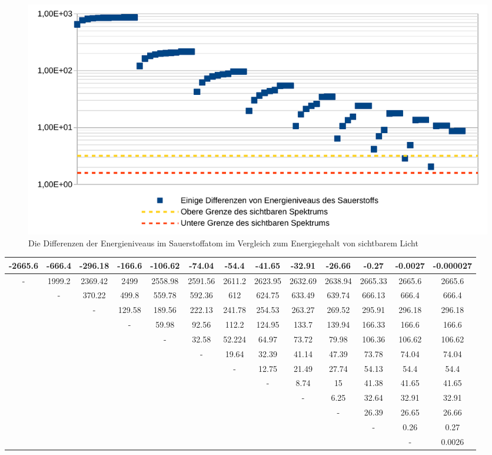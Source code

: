 \documentclass[11pt,a4paper,oneside]{report}
\begin{document}
\begin{figure}[ht]
\centering
\includegraphics[scale=0.7]{SauerstoffENiveaus.pdf}
\caption{Die Differenzen der Energieniveaus im Sauerstoffatom im Vergleich zum Energiegehalt von sichtbarem Licht}
\label{fig:ENO}
\end{figure}

\iffalse

\begin{table}[ht]
\centering
\begin{tabular}{|c|c|c|c|c|c|c|c|c|c|c|c|c|}
-2665.6&-666.4&-296.18&-166.6&-106.62&-74.04&-54.4&-41.65&-32.91&-26.66&-0.27&-0.0027&-0.000027 \\ \hline \hline
-&1999.2&2369.42&2499&2558.98&2591.56&2611.2&2623.95&2632.69&2638.94&2665.33&2665.6&2665.6\\ \hline
&-&370.22&499.8&559.78&592.36&612&624.75&633.49&639.74&666.13&666.4&666.4\\ \hline
&&-&129.58&189.56&222.13&241.78&254.53&263.27&269.52&295.91&296.18&296.18\\ \hline
&&&-&59.98&92.56&112.2&124.95&133.7&139.94&166.33&166.6&166.6\\ \hline
&&&&-&32.58&52.224&64.97&73.72&79.98&106.36&106.62&106.62\\ \hline
&&&&&-&19.64&32.39&41.14&47.39&73.78&74.04&74.04\\ \hline
&&&&&&-&12.75&21.49&27.74&54.13&54.4&54.4\\ \hline
&&&&&&&-&8.74&15&41.38&41.65&41.65\\ \hline
&&&&&&&&-&6.25&32.64&32.91&32.91\\ \hline
&&&&&&&&&-&26.39&26.65&26.66\\ \hline
&&&&&&&&&&-&0.26&0.27\\ \hline
&&&&&&&&&&&-&0.0026\\ \hline
\end{tabular}
\end{table}
\end{document}
